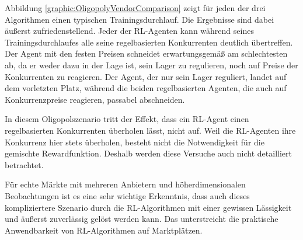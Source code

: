 Abbildung \ref{graphic:OligopolyVendorComparison} zeigt für jeden der drei Algorithmen einen typischen Trainingsdurchlauf.
Die Ergebnisse sind dabei äußerst zufriedenstellend.
Jeder der RL-Agenten kann während seines Trainingsdurchlaufes alle seine regelbasierten Konkurrenten deutlich übertreffen.
Der Agent mit den festen Preisen schneidet erwartungsgemäß am schlechtesten ab, da er weder dazu in der Lage ist, sein Lager zu regulieren, noch auf Preise der Konkurrenten zu reagieren.
Der Agent, der nur sein Lager reguliert, landet auf dem vorletzten Platz, während die beiden regelbasierten Agenten, die auch auf Konkurrenzpreise reagieren, passabel abschneiden.

In diesem Oligopolszenario tritt der Effekt, dass ein RL-Agent einen regelbasierten Konkurrenten überholen lässt, nicht auf.
Weil die RL-Agenten ihre Konkurrenz hier stets überholen, besteht nicht die Notwendigkeit für die gemischte Rewardfunktion.
Deshalb werden diese Versuche auch nicht detailliert betrachtet.

Für echte Märkte mit mehreren Anbietern und höherdimensionalen Beobachtungen ist es eine sehr wichtige Erkenntnis, dass auch dieses kompliziertere Szenario durch die RL-Algorithmen mit einer gewissen Lässigkeit und äußerst zuverlässig gelöst werden kann.
Das unterstreicht die praktische Anwendbarkeit von RL-Algorithmen auf Marktplätzen.